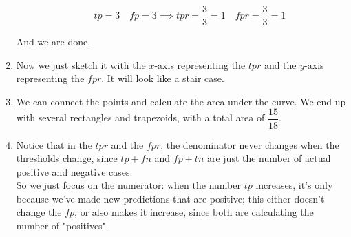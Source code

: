 \documentclass[12pt]{article}
\begin{document}
\begin{enumerate}[label = \letters]
\begin{enumerate}[label = \numbers]
    \[ tp = 3 \quad fp = 3 \implies 
    tpr = \dfrac{3}{3} = 1 \quad 
    fpr = \dfrac{3}{3} = 1 \]
\end{enumerate}
And we are done. \\
\item 
Now we just sketch it with the $x$-axis
representing the $tpr$ and the $y$-axis
representing the $fpr$.
It will look like a stair case.
\item 
We can connect the points and calculate the area
under the curve. We end up with several
rectangles and trapezoids, with a total area 
of $\dfrac{15}{18}$.
\item 
Notice that in the $tpr$ and the $fpr$,
the denominator never changes when the thresholds
change, since $tp + fn$ and $fp + tn$
are just the number of actual positive and negative
cases. \\
So we just focus on the numerator:
when the number $tp$ increases,
it's only because we've made new predictions
that are positive; this either doesn't
change the $fp$, or also makes it increase,
since both are calculating the number of
"positives". \\  
\end{enumerate}


\newpage
\end{document}
